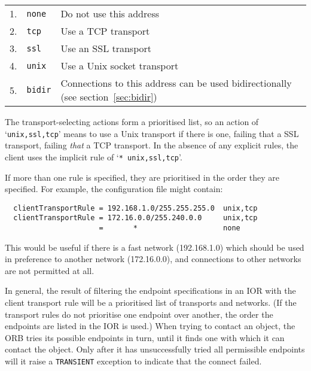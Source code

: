 \documentclass[11pt,twoside,a4paper]{book}
\newcommand{\code}[1]{\texttt{#1}}
\newcommand{\dsc}{\discretionary{}{}{}}
\begin{document}
\vspace{\baselineskip}

\begin{tabular}{llp{}}
1. & \code{none} & Do not use this address\\
2. & \code{tcp}  & Use a TCP transport\\
3. & \code{ssl}  & Use an SSL transport\\
4. & \code{unix} & Use a Unix socket transport\\
5. & \code{bidir}& Connections to this address can be used
                   bidirectionally (see section~\ref{sec:bidir})\\
\end{tabular}

\vspace{\baselineskip}

\noindent The transport-selecting actions form a prioritised list, so
an action of `\code{unix,ssl,\dsc{}tcp}' means to use a Unix transport if
there is one, failing that a SSL transport, failing \emph{that} a TCP
transport. In the absence of any explicit rules, the client uses the
implicit rule of `\code{* unix,ssl,tcp}'.

If more than one rule is specified, they are prioritised in the order
they are specified. For example, the configuration file might contain:

\begin{verbatim}
  clientTransportRule = 192.168.1.0/255.255.255.0  unix,tcp
  clientTransportRule = 172.16.0.0/255.240.0.0     unix,tcp
                      =       *                    none
\end{verbatim}

\noindent This would be useful if there is a fast network
(192.168.1.0) which should be used in preference to another network
(172.16.0.0), and connections to other networks are not permitted at
all.

In general, the result of filtering the endpoint specifications in an
IOR with the client transport rule will be a prioritised list of
transports and networks. (If the transport rules do not prioritise one
endpoint over another, the order the endpoints are listed in the IOR
is used.)  When trying to contact an object, the ORB tries its
possible endpoints in turn, until it finds one with which it can
contact the object. Only after it has unsuccessfully tried all
permissible endpoints will it raise a \code{TRANSIENT} exception to
indicate that the connect failed.
\end{document}
